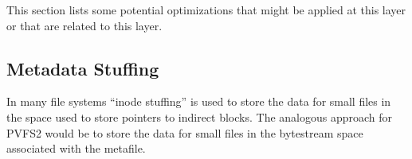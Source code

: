 \documentclass[10pt]{article} %
\begin{document}
This section lists some potential optimizations that might be applied at this
layer or that are related to this layer.

\subsection{Metadata Stuffing}

In many file systems ``inode stuffing'' is used to store the data for small
files in the space used to store pointers to indirect blocks.  The analogous
approach for PVFS2 would be to store the data for small files in the
bytestream space associated with the metafile.
\end{document}
